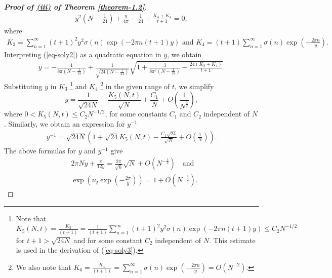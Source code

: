 \documentclass[11pt]{amsart}
\theoremstyle{plain}
\numberwithin{equation}{section}
\begin{document}
\begin{proof}[\textbf{\boldmath Proof of  \hyperlink{thm1.2iii}{{(iii)}} of Theorem \ref{theorem-1.2}}]
			\begin{align}\label{eq-soly2}
				y^{2}\left(N-\frac{1}{24}\right)+\frac{y}{4\pi}-\frac{1}{24}+\frac{K_3+K_4}{t+1}=0,
			\end{align}
			where
			\begin{align*}
				K_{3}=\sum_{n=1}^{\infty}(t+1)^{2}y^{2}\sigma(n)\exp(-2\pi n(t+1)y)\,\,\text{and  } K_{4}=(t+1)\sum_{n=1}^{\infty}\sigma(n)\exp\left(-\frac{2\pi n}{y}\right).
			\end{align*}
			Interpreting (\ref{eq-soly2}) as a quadratic equation in $y$, we obtain
			\begin{align*}
				y=-\frac{1}{8\pi\left(N-\frac{1}{24}\right)} +\frac{1}{\sqrt{24\left(N-\frac{1}{24}\right)}}\sqrt{1+\frac{3}{8\pi^{2}\left(N-\frac{1}{24}\right)}-\frac{24(K_3+K_4)}{t+1}}.   
			\end{align*}
			Substituting $y$ in $K_3$ \footnote{Note that  $K_5(N,t)=\frac{K_3}{(t+1)}=\frac{1}{(t+1)}\sum_{n=1}^{\infty}(t+1)^{2}y^{2}\sigma(n)\exp(-2\pi n(t+1)y)\le C_2N^{-1/2}$ for $t+1 > \sqrt{24N}$ and for some constant $C_{2}$ independent of $N$.  
				This estimate is used in the derivation of (\ref{eq-soly3}).} and $K_4$ \footnote{We also note that $K_6=\frac{K_4}{(t+1)}=\sum_{n=1}^{\infty}\sigma(n)\exp\left(-\frac{2\pi n}{y}\right)=O(N^{-2}).$} in the given range of $t$, we simplify
			\begin{equation}\label{eq-soly3}
				y=\frac{1}{\sqrt{24N}}-\frac{K_5(N,t)}{\sqrt{N}}+ \frac{C_{1}}{N}+O\left(\frac{1}{N^{\frac{3}{2}}}\right),  
			\end{equation}
			where $0<K_5(N,t)\le C_2N^{-1/2}$, for some constants $C_1$ and $C_2$ independent of $N$.
			\newline
			Similarly, we obtain an expression for $y^{-1}$ 
			\begin{align*}%
				y^{-1}=\sqrt{24N}\left(1+\sqrt{24}K_5(N,t)-\frac{C_1\sqrt{24}}{\sqrt{N}}+O\left(\frac{1}{N}\right)\right).   
			\end{align*}
			The above formulas for $y$ and $y^{-1}$ give
			\begin{equation}\label{eq-yy-inverse}
				\begin{aligned}
					&2\pi Ny+\frac{\pi}{12y}=\frac{2\pi}{\sqrt{6}}\sqrt{N}+O\left(N^{-\frac{1}{2}}\right)\quad \text{and}\\
					&\exp\left(\nu_2\exp\left(-\frac{2\pi}{y}\right)\right)=1+O\left(N^{-\frac{1}{2}}\right). 
				\end{aligned}
			\end{equation}

\end{proof}
\end{document}
